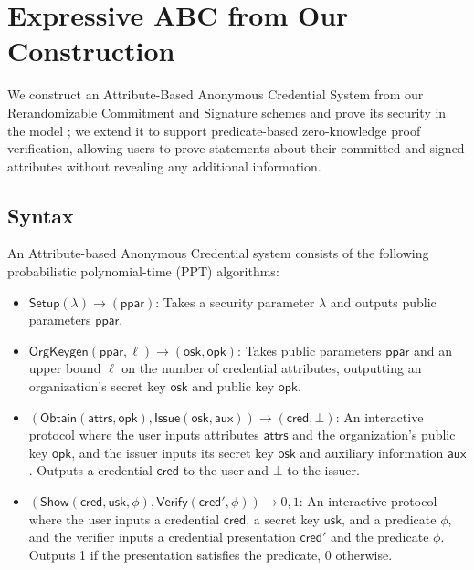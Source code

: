 \section{Expressive ABC from Our Construction}\label{sec:abc}

We construct an Attribute-Based Anonymous Credential System from our Rerandomizable Commitment and Signature schemes and prove its security in the model \cite{fuchsbauer_structure-preserving_2019}; we extend it to support predicate-based zero-knowledge proof verification, allowing users to prove statements about their committed and signed attributes without revealing any additional information.


\subsection{Syntax}
\begin{definition}\label{chap2_abc_system_definition}
An Attribute-based Anonymous Credential system consists of the following probabilistic polynomial-time (PPT) algorithms:
\begin{itemize}
\item $\mathsf{Setup}(\lambda) \to (\mathsf{ppar})$: Takes a security parameter $\lambda$ and outputs public parameters $\mathsf{ppar}$.

\item $\mathsf{OrgKeygen}(\mathsf{ppar}, \ell) \to (\mathsf{osk}, \mathsf{opk})$: Takes public parameters $\mathsf{ppar}$ and an upper bound $\ell$ on the number of credential attributes, outputting an organization's secret key $\mathsf{osk}$ and public key $\mathsf{opk}$.

\item $(\mathsf{Obtain}(\mathsf{attrs}, \mathsf{opk}), \mathsf{Issue}(\mathsf{osk}, \mathsf{aux})) \to (\mathsf{cred}, \bot)$: An interactive protocol where the user inputs attributes $\mathsf{attrs}$ and the organization's public key $\mathsf{opk}$, and the issuer inputs its secret key $\mathsf{osk}$ and auxiliary information $\mathsf{aux}$. Outputs a credential $\mathsf{cred}$ to the user and $\bot$ to the issuer.

\item $(\mathsf{Show}(\mathsf{cred}, \mathsf{usk}, \phi), \mathsf{Verify}(\mathsf{cred}', \phi)) \to {0,1}$: An interactive protocol where the user inputs a credential $\mathsf{cred}$, a secret key $\mathsf{usk}$, and a predicate $\phi$, and the verifier inputs a credential presentation $\mathsf{cred}'$ and the predicate $\phi$. Outputs 1 if the presentation satisfies the predicate, 0 otherwise.
\end{itemize}
\end{definition}

